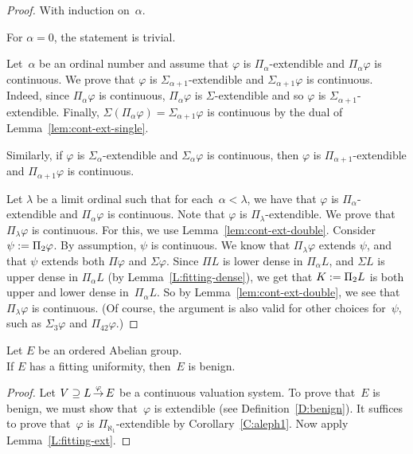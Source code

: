 \documentclass[main.tex]{subfiles}
\begin{document}
\begin{proof}
With induction on~$\alpha$.

\vspace{.3em}
For $\alpha=0$,
the statement is trivial.

\vspace{.3em}
Let~$\alpha$ be an ordinal number
and assume that $\varphi$
is $\Pi_\alpha$-extendible
and $\Pi_\alpha \varphi$ is continuous.
We prove that $\varphi$
is $\Sigma_{\alpha+1}$-extendible
and $\Sigma_{\alpha+1}\varphi$ is continuous.
Indeed,
since $\Pi_\alpha\varphi$ is continuous,
$\Pi_\alpha\varphi$ is $\Sigma$-extendible
and so $\varphi$ is $\Sigma_{\alpha+1}$-extendible.
Finally,
$\Sigma(\Pi_\alpha \varphi)=\Sigma_{\alpha+1}\varphi$
is continuous
by the dual of Lemma~\ref{lem:cont-ext-single}.

Similarly,
if $\varphi$ is $\Sigma_\alpha$-extendible
and $\Sigma_\alpha \varphi$ is continuous,
then $\varphi$
is $\Pi_{\alpha+1}$-extendible
and $\Pi_{\alpha+1}\varphi$ is continuous.

\vspace{.3em}
Let $\lambda$ be a limit ordinal
such that for each~$\alpha<\lambda$,
we have that $\varphi$ is $\Pi_\alpha$-extendible
and $\Pi_\alpha\varphi$ is continuous.
Note that $\varphi$ is $\Pi_\lambda$-extendible.
We prove that $\Pi_\lambda \varphi$ is continuous.
For this,
we use Lemma~\ref{lem:cont-ext-double}.
Consider $\psi := \Pi_2 \varphi$.
By assumption,
$\psi$ is continuous.
We know
that $\Pi_\lambda \varphi$ extends $\psi$,
and that $\psi$ extends both $\Pi\varphi$ and $\Sigma\varphi$.
Since $\Pi L$ is lower dense in $\Pi_\alpha L$,
and $\Sigma L$ is upper dense in $\Pi_\alpha L$
(by Lemma~\ref{L:fitting-dense}),
we get that $K:= \Pi_2 L$ is both upper and lower dense in~$\Pi_\alpha L$.
So by Lemma~\ref{lem:cont-ext-double},
we see that~$\Pi_\lambda\varphi$ is continuous.
(Of course, 
the argument is also valid for other choices for~$\psi$,
such as $\Sigma_3\varphi$ and $\Pi_{42} \varphi$.)
\end{proof}
%
%
\begin{thm}
\label{T:fitting-benign}
Let $E$ be an ordered Abelian group. \\
If $E$ has a fitting uniformity,
then~$E$ is benign.
\end{thm}
\begin{proof}
Let $V \supseteq L\,\smash{\stackrel{\varphi}{\rightarrow}}\,E$ be a continuous valuation system.
To prove that~$E$ is benign,
we must show that~$\varphi$ is extendible
(see Definition~\ref{D:benign}).
It suffices to prove that~$\varphi$ is $\Pi_{\aleph_1}$-extendible
by Corollary~\ref{C:aleph1}.
Now apply Lemma~\ref{L:fitting-ext}.
\end{proof}
\end{document}

